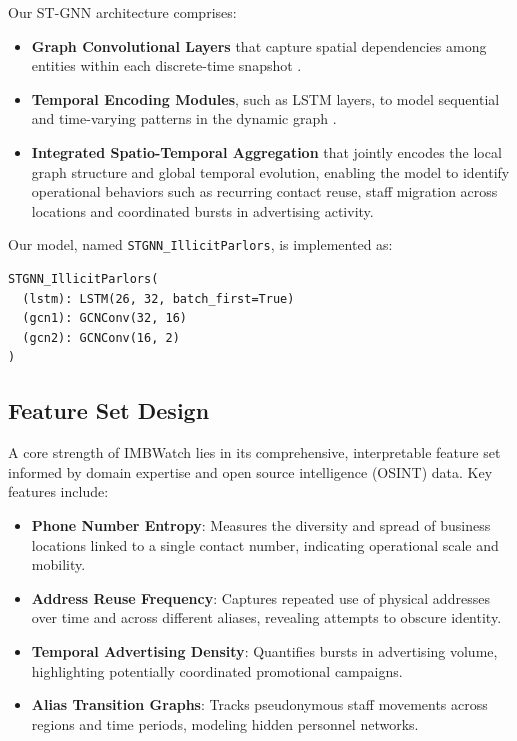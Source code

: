 \documentclass[letterpaper]{article} %
\begin{document}
Our ST-GNN architecture comprises:
\begin{itemize}
    \item \textbf{Graph Convolutional Layers} that capture spatial dependencies among entities within each discrete-time snapshot \cite{kipf2017semi}.
    \item \textbf{Temporal Encoding Modules}, such as LSTM layers, to model sequential and time-varying patterns in the dynamic graph \cite{li2018diffusion, yu2018spatio, zhao2023learning}.
    \item \textbf{Integrated Spatio-Temporal Aggregation} that jointly encodes the local graph structure and global temporal evolution, enabling the model to identify operational behaviors such as recurring contact reuse, staff migration across locations and coordinated bursts in advertising activity.
\end{itemize}

\noindent Our model, named \texttt{STGNN\_IllicitParlors}, is implemented as:

\begin{verbatim}
STGNN_IllicitParlors(
  (lstm): LSTM(26, 32, batch_first=True)
  (gcn1): GCNConv(32, 16)
  (gcn2): GCNConv(16, 2)
)
\end{verbatim}

\subsection{Feature Set Design}

A core strength of IMBWatch lies in its comprehensive, interpretable feature set informed by domain expertise and open source intelligence (OSINT) data. Key features include:

\begin{itemize}
    \item \textbf{Phone Number Entropy}: Measures the diversity and spread of business locations linked to a single contact number, indicating operational scale and mobility.
    \item \textbf{Address Reuse Frequency}: Captures repeated use of physical addresses over time and across different aliases, revealing attempts to obscure identity.
    \item \textbf{Temporal Advertising Density}: Quantifies bursts in advertising volume, highlighting potentially coordinated promotional campaigns.
    \item \textbf{Alias Transition Graphs}: Tracks pseudonymous staff movements across regions and time periods, modeling hidden personnel networks.
\end{itemize}
\end{document}

